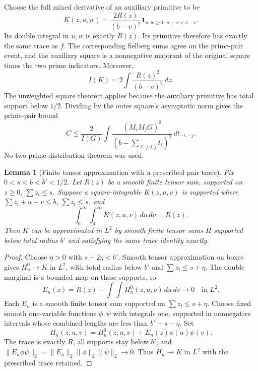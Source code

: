 \documentclass[11pt,a4paper]{article}
\newtheorem{lemma}[theorem]{Lemma}
\theoremstyle{definition}\newtheorem{definition}[theorem]{Definition}
\theoremstyle{remark}\newtheorem{remark}[theorem]{Remark}
\newcommand{\ind}{\mathbf 1}\newcommand{\dd}{\,d}
\numberwithin{equation}{section}
\begin{document}
Choose the full mixed derivative of an auxiliary primitive to be
\begin{equation}\label{eq:extension}
 K(z,u,w)=\frac{2R(z)}{(b-v)^2}\ind_{u,w\ge0,\ u+w<b-v}.
\end{equation}
Its double integral in $u,w$ is exactly $R(z)$. Its primitive therefore has exactly the same trace as $f$. The corresponding Selberg sums agree on the prime-pair event, and the auxiliary square is a nonnegative majorant of the original square times the two prime indicators. Moreover,
\[
 I(K)=2\int\frac{R(z)^2}{(b-v)^2}\dd z.
\]
The unweighted square theorem applies because the auxiliary primitive has total support below $1/2$. Dividing by the outer square's asymptotic norm gives the prime-pair bound
\begin{equation}\label{eq:extensionenergy}
 C\le\frac{2}{I(G)}\int\frac{(M_iM_jG)^2}{(b-\sum_{\ell\ne i,j}t_\ell)^2}\dd t_{-i,-j}.
\end{equation}
No two-prime distribution theorem was used.

\begin{lemma}[Finite tensor approximation with a prescribed pair trace]\label{lem:trace-approximation}
Fix $0<s<b<b'<1/2$. Let $R(z)$ be a smooth finite tensor sum, supported on $z\ge0$, $\sum z_l\le s$. Suppose a square-integrable $K(z,u,v)$ is supported where $\sum z_l+u+v\le b$, $\sum z_l\le s$, and
\[
 \int_0^\infty\!\int_0^\infty K(z,u,v)\dd u\dd v=R(z).
\]
Then $K$ can be approximated in $L^2$ by smooth finite tensor sums $H$ supported below total radius $b'$ and satisfying the same trace identity exactly.
\end{lemma}
\begin{proof}
Choose $\eta>0$ with $s+2\eta<b'$. Smooth tensor approximation on boxes gives $H_n^0\to K$ in $L^2$, with total radius below $b'$ and $\sum z_l\le s+\eta$. The double marginal is a bounded map on these supports, so
\[
 E_n(z)=R(z)-\int\!\int H_n^0(z,u,v)\dd u\dd v\longrightarrow0
 \quad\text{in }L^2.
\]
Each $E_n$ is a smooth finite tensor sum supported on $\sum z_l\le s+\eta$. Choose fixed smooth one-variable functions $\phi,\psi$ with integrals one, supported in nonnegative intervals whose combined lengths are less than $b'-s-\eta$. Set
\[
 H_n(z,u,v)=H_n^0(z,u,v)+E_n(z)\phi(u)\psi(v).
\]
The trace is exactly $R$, all supports stay below $b'$, and
$\|E_n\phi\psi\|_2=\|E_n\|_2\|\phi\|_2\|\psi\|_2\to0$.
Thus $H_n\to K$ in $L^2$ with the prescribed trace retained.
\end{proof}
\end{document}
